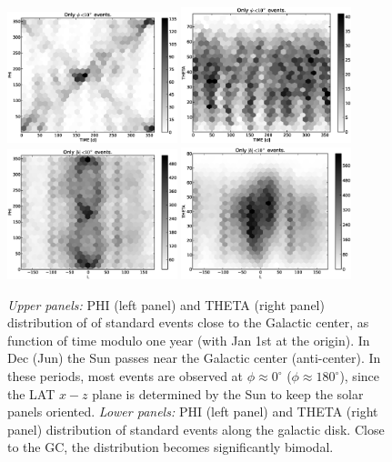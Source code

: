 \documentclass[aps,twocolumn,prd,superscriptaddress,showpacs,nofootinbib,fixfloat]{revtex4}
\begin{document}
\begin{figure}
  \centering
  \includegraphics[width=0.44\textwidth]{plots/TIME_PHI.eps}
  \includegraphics[width=0.44\textwidth]{plots/TIME_THETA.eps}
  \includegraphics[width=0.44\textwidth]{plots/L_PHI.eps}
  \includegraphics[width=0.44\textwidth]{plots/L_THETA.eps}
  \caption{\emph{Upper panels:} PHI (left panel) and THETA (right panel)
  distribution of of standard events close to the Galactic center, as function of time modulo one year (with Jan 1st
  at the origin). In Dec (Jun) the Sun passes near the Galactic center
  (anti-center).  In these periods, most events are observed at $\phi\approx
  0^\circ$ ($\phi\approx 180^\circ$), since the LAT $x-z$ plane is
  determined by the Sun to keep the solar panels oriented. \emph{Lower panels:}
  PHI (left panel) and THETA (right panel) distribution of standard events along the
  galactic disk. Close to the GC, the distribution becomes significantly
  bimodal.}
  \label{fig:time_phi}
\end{figure}
\end{document}
